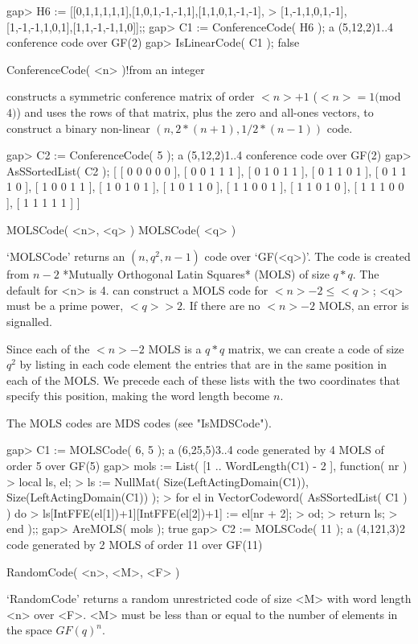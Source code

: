 \beginexample
gap> H6 := [[0,1,1,1,1,1],[1,0,1,-1,-1,1],[1,1,0,1,-1,-1],
> [1,-1,1,0,1,-1],[1,-1,-1,1,0,1],[1,1,-1,-1,1,0]];;
gap> C1 := ConferenceCode( H6 );
a (5,12,2)1..4 conference code over GF(2)
gap> IsLinearCode( C1 );
false 
\endexample

\>ConferenceCode( <n> )!{from an integer}

{\GUAVA} constructs a symmetric conference  matrix of order $<n>+1$ ($<n>
= 1 ($mod  $4)$) and uses  the rows of that matrix,   plus the zero  and
all-ones vectors, to construct a binary  non-linear $(n, 2*(n+1), 1/2 *
(n-1))$ code.

\beginexample
gap> C2 := ConferenceCode( 5 );
a (5,12,2)1..4 conference code over GF(2)
gap> AsSSortedList( C2 );
[ [ 0 0 0 0 0 ], [ 0 0 1 1 1 ], [ 0 1 0 1 1 ], [ 0 1 1 0 1 ], [ 0 1 1 1 0 ], 
  [ 1 0 0 1 1 ], [ 1 0 1 0 1 ], [ 1 0 1 1 0 ], [ 1 1 0 0 1 ], [ 1 1 0 1 0 ], 
  [ 1 1 1 0 0 ], [ 1 1 1 1 1 ] ]
\endexample

\>MOLSCode( <n>, <q> )
\>MOLSCode( <q> )

`MOLSCode' returns an  $(n, q^2, n-1)$ code over  `GF(<q>)'.  The code is
created from $n-2$ *Mutually Orthogonal  Latin Squares* (MOLS) of size $q
* q$. The default for <n> is  4. {\GUAVA} can  construct a MOLS code for
$<n>-2 \leq <q>$; <q> must be a prime power, $<q>  > 2$.  If there are no
$<n>-2$ MOLS, an error is signalled.

Since each of the $<n>-2$ MOLS  is a $q*q$  matrix, we can create a code
of size $q^2$ by listing in each code element the entries that are in the
same position in  each of the MOLS.  We precede each  of these lists with
the two  coordinates that specify this  position,  making the word length
become $n$.

The MOLS codes are MDS codes (see "IsMDSCode").

\beginexample
gap> C1 := MOLSCode( 6, 5 );
a (6,25,5)3..4 code generated by 4 MOLS of order 5 over GF(5)
gap> mols := List( [1 .. WordLength(C1) - 2 ], function( nr )
>       local ls, el;
>       ls := NullMat( Size(LeftActingDomain(C1)), Size(LeftActingDomain(C1)) );
>       for el in VectorCodeword( AsSSortedList( C1 ) ) do
>          ls[IntFFE(el[1])+1][IntFFE(el[2])+1] := el[nr + 2];
>       od;
>       return ls;
>    end );;
gap> AreMOLS( mols );
true
gap> C2 := MOLSCode( 11 );
a (4,121,3)2 code generated by 2 MOLS of order 11 over GF(11) 
\endexample

\>RandomCode( <n>, <M>, <F> )

`RandomCode' returns  a random unrestricted  code of  size <M> with  word
length <n>  over <F>. <M> must  be less than  or equal  to the  number of
elements in the space $GF(q)^n$.

